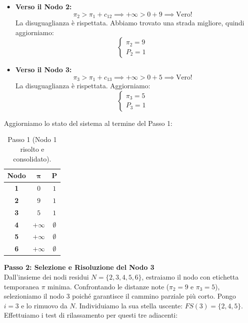\documentclass[12pt, a4paper]{article}
\begin{document}
	\begin{itemize}
		\item \textbf{Verso il Nodo 2:} 
		\[
		\pi_2 > \pi_1 + c_{12} \implies +\infty > 0 + 9 \implies \text{Vero!}
		\]
		La disuguaglianza è rispettata. Abbiamo trovato una strada migliore, quindi aggiorniamo:
		\[
		\begin{cases}
			\pi_2 = 9 \\
			P_2 = 1
		\end{cases}
		\]
		
		\item \textbf{Verso il Nodo 3:} 
		\[
		\pi_3 > \pi_1 + c_{13} \implies +\infty > 0 + 5 \implies \text{Vero!}
		\]
		La disuguaglianza è rispettata. Aggiorniamo:
		\[
		\begin{cases}
			\pi_3 = 5 \\
			P_3 = 1
		\end{cases}
		\]
	\end{itemize}
	Aggiorniamo lo stato del sistema al termine del Passo 1:
	\begin{table}[H]
		\centering
		\begin{tabular}{|c|c|c|}
			\hline
			\textbf{Nodo} & $\boldsymbol{\pi}$ & $\mathbf{P}$ \\
			\hline
			\rowcolor{titlecolor!20} \textbf{1} & $0$ & $1$ \\
			\textbf{2} & $9$ & $1$ \\
			\textbf{3} & $5$ & $1$ \\
			\textbf{4} & $+\infty$ & $\emptyset$ \\
			\textbf{5} & $+\infty$ & $\emptyset$ \\
			\textbf{6} & $+\infty$ & $\emptyset$ \\
			\hline
		\end{tabular}
		\caption*{Passo 1 (Nodo 1 risolto e consolidato).}
	\end{table}
	
	\textbf{Passo 2: Selezione e Risoluzione del Nodo 3}\\
	Dall'insieme dei nodi residui $N = \{2, 3, 4, 5, 6\}$, estraiamo il nodo con etichetta temporanea $\pi$ minima. Confrontando le distanze note ($\pi_2 = 9$ e $\pi_3 = 5$), selezioniamo il nodo 3 poiché garantisce il cammino parziale più corto.
	Pongo $i = 3$ e lo rimuovo da $N$. 
	Individuiamo la sua stella uscente: $FS(3) = \{2, 4, 5\}$.
	Effettuiamo i test di rilassamento per questi tre adiacenti:
	
\end{document}
